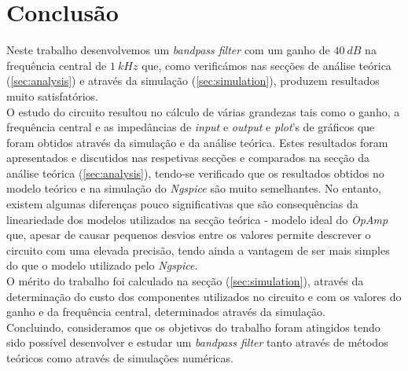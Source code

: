\section{Conclusão}
\label{sec:conclusion}

Neste trabalho desenvolvemos um \emph{bandpass filter} com um ganho de $40 \: dB$ na frequência central de $1 \: kHz$ que, como
verificámos nas secções de análise teórica (\ref{sec:analysis}) e através da simulação (\ref{sec:simulation}), produzem resultados
muito satisfatórios.
\\
O estudo do circuito resultou no cálculo de várias grandezas tais como o ganho, a frequência central e as impedâncias de \emph{input}
e \emph{output} e \emph{plot}'s de gráficos que foram obtidos através da simulação e da análise teórica.
Estes resultados foram apresentados e discutidos nas respetivas secções e comparados na secção da análise teórica (\ref{sec:analysis}),
tendo-se verificado que os resultados obtidos no modelo teórico e na simulação do \emph{Ngspice} são muito semelhantes. No entanto,
existem algumas diferenças pouco significativas que são consequências da lineariedade dos modelos utilizados na secção teórica - modelo
ideal do \emph{OpAmp} que, apesar de causar pequenos desvios entre os valores permite descrever o circuito com uma elevada precisão, tendo ainda
a vantagem de ser mais simples do que o modelo utilizado pelo \emph{Ngspice}.
\\
O mérito do trabalho foi calculado na secção (\ref{sec:simulation}), através da determinação do custo dos componentes utilizados no
circuito e com os valores do ganho e da frequência central, determinados através da simulação.
\\
Concluindo, consideramos que os objetivos do trabalho foram atingidos tendo sido possível desenvolver e estudar um \emph{bandpass
filter} tanto através de métodos teóricos como através de simulações numéricas.